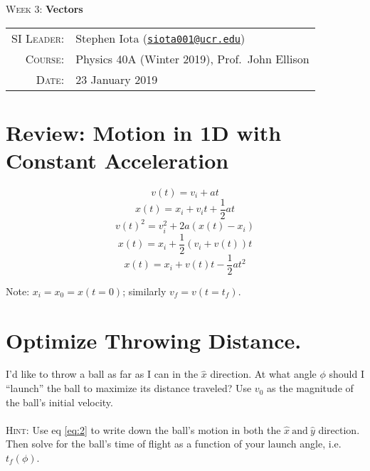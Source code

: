 \documentclass[12pt]{article}
\newcommand{\email}[1]{\texttt{\href{mailto:#1}{#1}}}
\begin{document}
\begin{center}

\Large{\textsc{Week 3}: \textbf{Vectors}}

\end{center}

\vspace{.5mm}



\begin{tabular}{rl}
\textsc{SI Leader}:
&
Stephen Iota (\email{siota001@ucr.edu})
\\
\textsc{Course}:
&
Physics 40A (Winter 2019), Prof.~John Ellison
\\
\textsc{Date}:
&
23 January 2019
\end{tabular}


\vspace{5mm}
\section*{Review: Motion in 1D with Constant Acceleration}


\begin{equation}
	v(t) = v_i + at
\end{equation}
\begin{equation}
\label{eq:2}
	x(t) = x_i + v_it + \frac{1}{2}at
\end{equation}
\begin{equation}
	v(t)^2 = v_{i}^2	 + 2a(x(t) - x_i)
\end{equation}
\begin{equation}
	x(t) = x_i + \frac{1}{2}(v_i + v(t))t
\end{equation}
\begin{equation}
	x(t) = x_i + v(t)t - \frac{1}{2}at^2
\end{equation}

Note: $x_i = x_0 = x(t=0)$; similarly $v_f = v(t=t_f)$.


\vspace{5mm}

\section{Optimize Throwing Distance.}
I'd like to throw a ball as far as I can in the $\hat{x}$ direction. At what angle $\phi$ should I ``launch'' the ball to maximize its distance traveled? Use $v_0$ as the magnitude of the ball's initial velocity.
\\
\\
\noindent
\textsc{Hint:}
Use eq \ref{eq:2} to write down the ball's motion in both the $\hat{x} \ \mathrm{and} \ \hat{y}$ direction. Then solve for the ball's time of flight as a function of your launch angle, i.e. $t_f(\phi)$.
\end{document}
